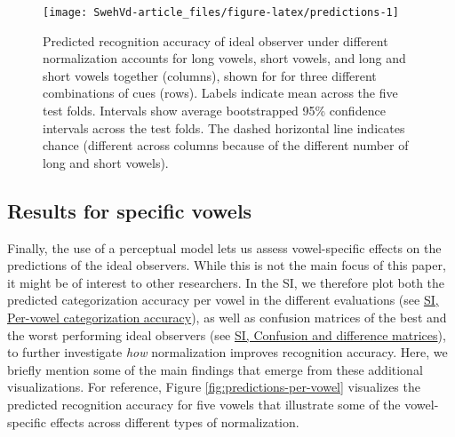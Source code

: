 \documentclass[utf8]{frontiersSCNS}
\begin{document}
\begin{figure}

{\centering \texttt{[image: SwehVd-article\_files/figure-latex/predictions-1]} 

}

\caption{Predicted recognition accuracy of ideal observer under different normalization accounts for long vowels, short vowels, and long and short vowels together (columns), shown for for three different combinations of cues (rows). Labels indicate mean across the five test folds. Intervals show average bootstrapped 95\% confidence intervals across the test folds. The dashed horizontal line indicates chance (different across columns because of the different number of long and short vowels).}\label{fig:predictions}
\end{figure}

\hypertarget{sec:resultsII-perVowel}{%
\subsection*{Results for specific vowels}\label{sec:resultsII-perVowel}}

Finally, the use of a perceptual model lets us assess vowel-specific effects on the predictions of the ideal observers. While this is not the main focus of this paper, it might be of interest to other researchers. In the SI, we therefore plot both the predicted categorization accuracy per vowel in the different evaluations (see \protect\hyperlink{sec:accuracy-per-vowel}{SI, Per-vowel categorization accuracy}), as well as confusion matrices of the best and the worst performing ideal observers (see \protect\hyperlink{sec:confusion}{SI, Confusion and difference matrices}), to further investigate \emph{how} normalization improves recognition accuracy. Here, we briefly mention some of the main findings that emerge from these additional visualizations. For reference, Figure \ref{fig:predictions-per-vowel} visualizes the predicted recognition accuracy for five vowels that illustrate some of the vowel-specific effects across different types of normalization.
\end{document}
